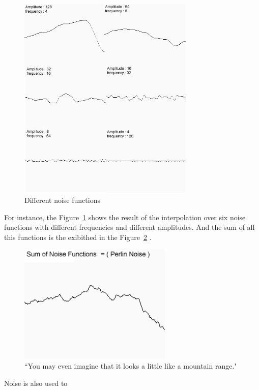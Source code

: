 \begin{figure}[H]
	\centering
	\includegraphics[width=0.75\textwidth]{img/Theory/Perlin_Noise/Merge.png}
	\caption{Different noise functions}
	\label{fig:merge}
\end{figure}



For instance, the Figure~\ref{fig:merge} shows the result of the interpolation over six noise functions with different frequencies and different amplitudes. And the sum of all this functions is the exibithed in the Figure~\ref{fig:noise} \cite{NoisesELIAS}.

\begin{figure}[htbp]
	\centering
	\includegraphics[width=0.65\textwidth]{img/Theory/Perlin_Noise/perlin1.png}
	\caption{``You may even imagine that it looks a little like a mountain range."}
	\label{fig:noise}
\end{figure}

Noise is also used to 

